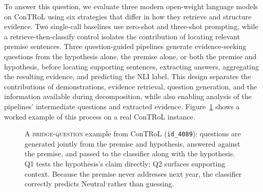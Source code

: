 \documentclass[11pt]{article}
\begin{document}
To answer this question, we evaluate three modern open-weight language models
on ConTRoL using six strategies that differ in how they retrieve and
structure evidence. Two single-call baselines use zero-shot and three-shot
prompting, while a retrieve-then-classify control isolates the contribution
of locating relevant premise sentences. Three question-guided pipelines
generate evidence-seeking questions from the hypothesis alone, the premise
alone, or both the premise and hypothesis, before locating supporting
sentences, extracting answers, aggregating the resulting evidence, and
predicting the NLI label. This design separates the contributions of
demonstrations, evidence retrieval, question generation, and the information
available during decomposition, while also enabling analysis of the
pipelines' intermediate questions and extracted evidence. Figure~\ref{fig:example}
shows a worked example of this process on a real ConTRoL instance.

\begin{figure}[t]
\centering
\small
{}
\caption{A \textsc{bridge-question} example from ConTRoL (\texttt{id\_4089}):
questions are generated jointly from the premise and hypothesis, answered
against the premise, and passed to the classifier along with the hypothesis.
Q1 tests the hypothesis's claim directly; Q2 surfaces supporting context.
Because the premise never addresses next year, the classifier correctly
predicts Neutral rather than guessing.}
\label{fig:example}
\end{figure}
\end{document}
